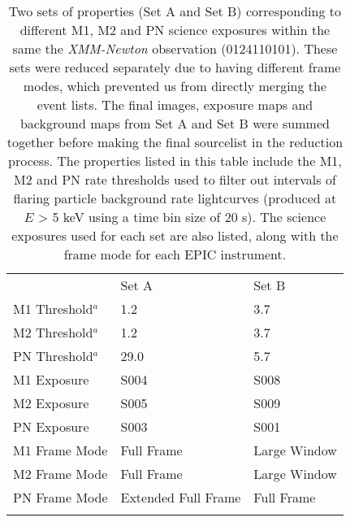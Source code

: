 \documentclass[fleqn,usenatbib]{mnras}
\begin{document}
 
    \begin{table*}
    \caption{Two sets of properties (Set A and Set B) corresponding to different M1, M2 and PN science exposures within the same the \textit{XMM-Newton} observation (0124110101). These sets were reduced separately due to having different frame modes, which prevented us from directly merging the event lists. The final images, exposure maps and background maps from Set A and Set B were summed together before making the final sourcelist in the reduction process. The properties listed in this table include the M1, M2 and PN rate thresholds used to filter out intervals of flaring particle background rate lightcurves (produced at $E$ > 5 keV using a time bin size of 20 s). The science exposures used for each set are also listed, along with the frame mode for each EPIC instrument.}
    \centering
    \setlength{\extrarowheight}{7pt}
    \begin{tabularx}{\textwidth}{XXX}
        \hline    
                            &                Set A &          Set B \\
        \addlinespace[4pt]
        \hline    
         M1 Threshold$^{a}$ &                  1.2 &            3.7 \\
         M2 Threshold$^{a}$ &                  1.2 &            3.7 \\
         PN Threshold$^{a}$ &                 29.0 &            5.7 \\
                M1 Exposure &                 S004 &           S008 \\
                M2 Exposure &                 S005 &           S009 \\
                PN Exposure &                 S003 &           S001 \\
              M1 Frame Mode &           Full Frame &   Large Window \\
              M2 Frame Mode &           Full Frame &   Large Window \\
              PN Frame Mode &  Extended Full Frame &     Full Frame \\
        \addlinespace[4pt]
        \hline
        \multicolumn{3}{l}{$^a$ In units of count s$^{-1}$.}\\
    \end{tabularx}
    \label{table:summedobs}
    \end{table*}
    
\end{document}
